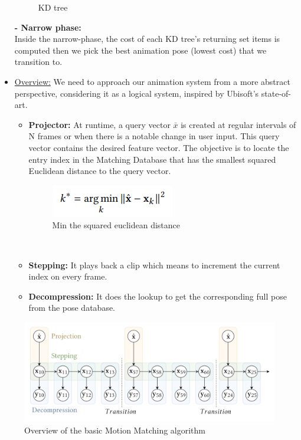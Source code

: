 \documentclass[12pt]{book}
\begin{document}
\begin{itemize}
\begin{figure}[!h]
              \caption{KD tree}
              \label{KD tree}
          \end{figure}
          \textbf{- Narrow phase:}\\
          Inside the narrow-phase, the cost of each KD tree’s returning set items is computed then we
          pick the best animation pose (lowest cost) that we transition to.
    \item \underline{Overview:}
          We need to approach our animation system from a more abstract perspective, considering it as
          a logical system, inspired by Ubisoft’s state-of-art.
          \begin{itemize}
              \item \textbf{Projector:} At runtime, a query vector $\bar{x}$ is created at regular intervals of N frames
                    or when there is a notable change in user input. This query vector contains the desired
                    feature vector. The objective is to locate the entry index in the Matching Database that
                    has the smallest squared Euclidean distance to the query vector.
                    \begin{figure}[!h]
                        \centering
                        \includegraphics[scale=1.2]{./Figures/Images/EuclidienDist.jpg}
                        \caption{Min the squared euclidean distance}
                        \label{Min the squared euclidean distance}
                    \end{figure}\\
              \item \textbf{Stepping:} It plays back a clip which means to increment the current index on every frame.
              \item \textbf{Decompression: }It does the lookup to get the corresponding full pose from the pose database.
          \end{itemize}
\end{itemize}
\begin{figure}[!h]
    \centering
    \includegraphics[scale=1.2]{./Figures/Images/OverviewMM.jpg}
    \caption{Overview of the basic Motion Matching algorithm}
    \label{Overview of the basic Motion Matching algorithm}
\end{figure}
\end{document}
